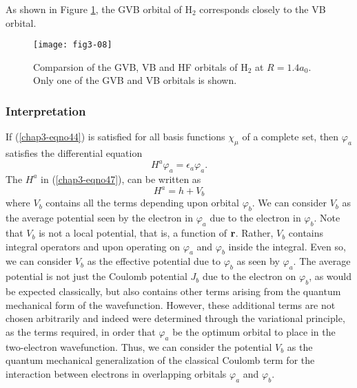 As shown in Figure \ref{fig3-09}, the GVB orbital
of H$_2$ corresponds closely to the VB orbital.

\begin{figure}
\texttt{[image: fig3-08]}
\caption{Comparsion of the GVB, VB and HF orbitals of H$_2$ at $R =
1.4a_0$.  Only one of the GVB and VB orbitals is shown.}
\label{fig3-09}
\end{figure}



\subsubsection{Interpretation}

If (\ref{chap3-eqno44}) is satisfied for all basis functions
$\chi_{\mu}$ of a complete set, then $\varphi_a$ satisfies the
differential equation
\begin{equation}
H^a \varphi_a = \epsilon_a \varphi_a .
\label{chap3-eqno47}
\end{equation}
The $H^a$ in (\ref{chap3-eqno47}), can be written as
\begin{equation}
H^a = h + V_b
\label{chap3-eqno48}
\end{equation}
where $V_b$ contains all the terms depending upon orbital $\varphi_b$.  We 
can consider $V_b$ as the average potential seen by the electron in 
$\varphi_a$ due to the electron in $\varphi_b$.  Note that $V_b$ is not a
local potential, that is, a function of ${\bf r}$.  Rather, $V_b$ 
contains integral operators and upon operating on $\varphi_a$ and $\varphi_b$ 
inside the integral.  Even so, we can consider $V_b$ as the effective
potential due to $\varphi_b$ as seen by $\varphi_a$.  The average potential 
is not just the Coulomb potential $J_b$ due to the electron on $\varphi_b$, 
as would be expected classically, but also contains other terms arising 
from the quantum mechanical form of the wavefunction.  However, these
additional terms are not chosen arbitrarily and indeed were determined 
through the variational principle, as the terms required, in order 
that $\varphi_a$ be the optimum orbital to place in the two-electron 
wavefunction.  Thus, we can consider the potential $V_b$ as the
quantum mechanical generalization of the classical Coulomb term for 
the interaction between electrons in overlapping orbitals $\varphi_a$ and 
$\varphi_b$.


